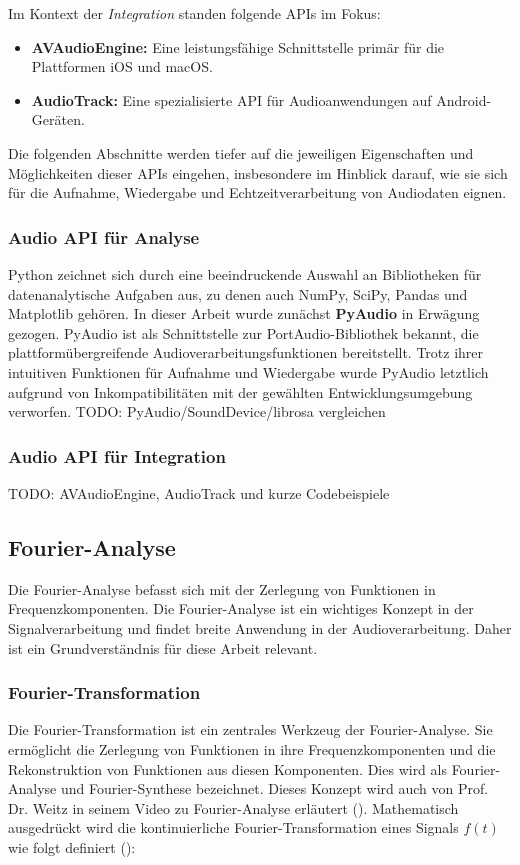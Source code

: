 \documentclass[11pt,a4paper]{article}
\begin{document}
\noindent
Im Kontext der \textit{Integration} standen folgende APIs im Fokus:

\begin{itemize}
	\item \textbf{AVAudioEngine:} Eine leistungsfähige Schnittstelle primär für die Plattformen iOS 
    und macOS.
	\item \textbf{AudioTrack:} Eine spezialisierte API für Audioanwendungen auf Android-Geräten.
\end{itemize}

\noindent
Die folgenden Abschnitte werden tiefer auf die jeweiligen Eigenschaften und Möglichkeiten dieser 
APIs eingehen, insbesondere im Hinblick darauf, wie sie sich für die Aufnahme, Wiedergabe und 
Echtzeitverarbeitung von Audiodaten eignen.

\subsubsection{Audio API für Analyse}
Python zeichnet sich durch eine beeindruckende Auswahl an Bibliotheken für datenanalytische Aufgaben 
aus, zu denen auch NumPy, SciPy, Pandas und Matplotlib gehören. In dieser Arbeit wurde zunächst 
\textbf{PyAudio} in Erwägung gezogen. PyAudio ist als Schnittstelle zur PortAudio-Bibliothek 
bekannt, die plattformübergreifende Audioverarbeitungsfunktionen bereitstellt. Trotz ihrer 
intuitiven Funktionen für Aufnahme und Wiedergabe wurde PyAudio letztlich aufgrund von 
Inkompatibilitäten mit der gewählten Entwicklungsumgebung verworfen.
TODO: PyAudio/SoundDevice/librosa vergleichen

\subsubsection{Audio API für Integration}
TODO: AVAudioEngine, AudioTrack und kurze Codebeispiele

\newpage \subsection{Fourier-Analyse}
Die Fourier-Analyse befasst sich mit der Zerlegung von Funktionen in Frequenzkomponenten. Die
Fourier-Analyse ist ein wichtiges Konzept in der Signalverarbeitung und findet breite Anwendung
in der Audioverarbeitung. Daher ist ein Grundverständnis für diese Arbeit relevant.

\subsubsection{Fourier-Transformation}
Die Fourier-Transformation ist ein zentrales Werkzeug der Fourier-Analyse. Sie ermöglicht die
Zerlegung von Funktionen in ihre Frequenzkomponenten und die Rekonstruktion von Funktionen aus
diesen Komponenten. Dies wird als Fourier-Analyse und Fourier-Synthese bezeichnet. Dieses Konzept
wird auch von Prof. Dr. Weitz in seinem Video zu Fourier-Analyse erläutert
(\cite[2:20]{weitz2023fourier}). Mathematisch ausgedrückt wird die kontinuierliche
Fourier-Transformation eines Signals \( f(t) \) wie folgt definiert
(\cite[Chapter~5]{hansen2014fourier}):
\end{document}
